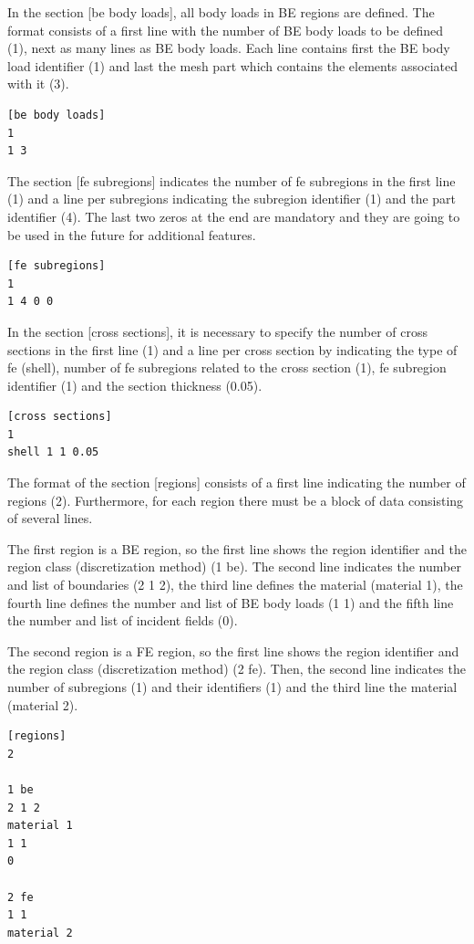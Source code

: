 \documentclass[a4]{article}
\begin{document}
In the section [be body loads], all body loads in BE regions are defined. The format consists of a first line with the number of BE body loads to be defined (1), next as many lines as BE body loads. Each line contains first the BE body load identifier (1) and last the mesh part which contains the elements associated with it (3).

\begin{Verbatim}
[be body loads]
1
1 3
\end{Verbatim}

The section [fe subregions] indicates the number of fe subregions in the first line (1) and a line per subregions indicating the subregion identifier (1) and the part identifier (4). The last two zeros at the end are mandatory and they are going to be used in the future for additional features.

\begin{Verbatim}
[fe subregions]
1
1 4 0 0
\end{Verbatim}

In the section [cross sections], it is necessary to specify the number of cross sections in the first line (1) and a line per cross section by indicating the type of fe (shell), number of fe subregions related to the cross section (1), fe subregion identifier (1) and the section thickness (0.05).

\begin{Verbatim}
[cross sections]
1
shell 1 1 0.05
\end{Verbatim}

The format of the section [regions] consists of a first line indicating the number of regions (2). Furthermore, for each region there must be a block of data consisting of several lines. 

The first region is a BE region, so the first line shows the region identifier and the region class (discretization method) (1 be). The second line indicates the number and list of boundaries (2 1 2), the third line defines the material (material 1), the fourth line defines the number and list of BE body loads (1 1) and the fifth line the number and list of incident fields (0).

The second region is a FE region, so the first line shows the region identifier and the region class (discretization method) (2 fe). Then, the second line indicates the number of subregions (1) and their identifiers (1) and the third line the material (material 2). 

\begin{Verbatim}	
[regions]
2

1 be
2 1 2
material 1 
1 1
0

2 fe
1 1
material 2 
\end{Verbatim}
\end{document}
